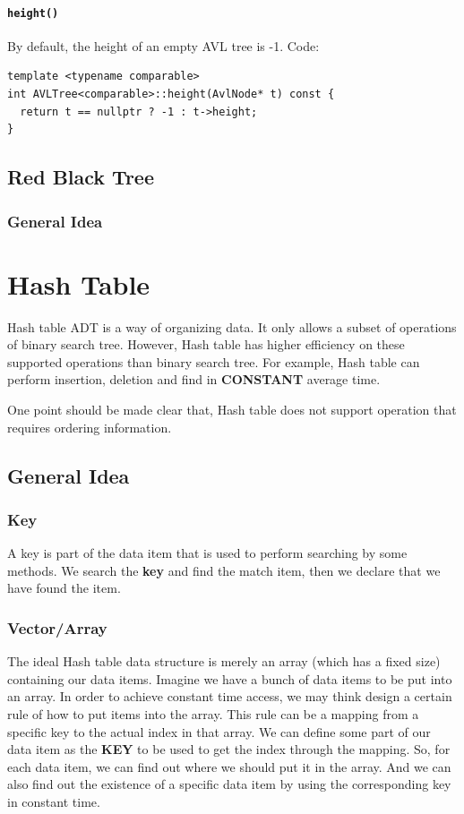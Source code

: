 \documentclass[12pt]{book}
\begin{document}
\subsubsection{\texttt{height()}}
\label{sec:orge69b0d6}
By default, the height of an empty AVL tree is -1. Code:
\begin{verbatim}
template <typename comparable>
int AVLTree<comparable>::height(AvlNode* t) const {
  return t == nullptr ? -1 : t->height;
}
\end{verbatim}

\section{Red Black Tree}
\label{sec:orgdf5d7d6}
\subsection{General Idea}
\label{sec:org07c3af6}
\chapter{Hash Table}
\label{sec:orgf62326e}
Hash table ADT is a way of organizing data. It only allows a subset of operations of binary search tree. However, Hash table has higher efficiency on these supported operations than binary search tree. For example, Hash table can perform insertion, deletion and find in \textbf{CONSTANT} average time.

One point should be made clear that, Hash table does not support operation that requires ordering information.
\section{General Idea}
\label{sec:orga153ded}
\subsection{Key}
\label{sec:org33856f9}

A key is part of the data item that is used to perform searching by some methods. We search the \textbf{key} and find the match item, then we declare that we have found the item.
\subsection{Vector/Array}
\label{sec:orgeeb8e56}

The ideal Hash table data structure is merely an array (which has a fixed size) containing our data items. Imagine we have a bunch of data items to be put into an array. In order to achieve constant time access, we may think design a certain rule of how to put items into the array. This rule can be a mapping from a specific key to the actual index in that array. We can define some part of our data item as the \textbf{KEY} to be used to get the index through the mapping. So, for each data item, we can find out where we should put it in the array. And we can also find out the existence of a specific data item by using the corresponding key in constant time.
\end{document}
